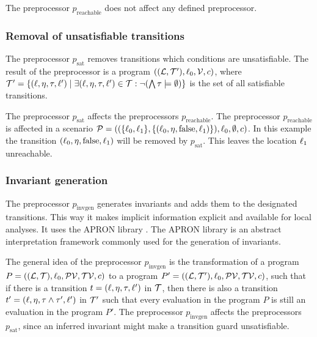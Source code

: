 The preprocessor $p_{\text{reachable}}$ does not affect any defined preprocessor.

\subsubsection{Removal of unsatisfiable transitions}

The preprocessor $p_{\text{sat}}$ removes transitions which conditions are unsatisfiable.
The result of the preprocessor is a program $((\mathcal{L}, \mathcal{T}'), \ell_0, \mathcal{V}, c)$, where $\mathcal{T}' = \lbrace (\ell,\eta,\tau,\ell') \mid \exists (\ell,\eta,\tau,\ell') \in \mathcal{T}: \neg (\bigwedge \tau \models \emptyset) \rbrace$ is the set of all satisfiable transitions.

The preprocessor $p_{\text{sat}}$ affects the preprocessors $p_{\text{reachable}}$.
The preprocessor $p_{\text{reachable}}$ is affected in a scenario $\mathcal{P} = ((\lbrace \ell_0, \ell_1 \rbrace, \lbrace (\ell_0,\eta,\text{false},\ell_1) \rbrace), \ell_0, \emptyset, c)$.
In this example the transition $(\ell_0,\eta,\text{false},\ell_1)$ will be removed by $p_{\text{sat}}$.
This leaves the location $\ell_1$ unreachable.

\subsubsection{Invariant generation}

The preprocessor $p_{\text{invgen}}$ generates invariants and adds them to the designated transitions.
This way it makes implicit information explicit and available for local analyses.
It uses the APRON library \cite{apron}.
The APRON library is an abstract interpretation framework commonly used for the generation of invariants.

The general idea of the preprocessor $p_{\text{invgen}}$ is the transformation of a program $P = ((\mathcal{L}, \mathcal{T}), \ell_0, \mathcal{PV}, \mathcal{TV}, c)$ to a program $P' = ((\mathcal{L}, \mathcal{T}'), \ell_0, \mathcal{PV}, \mathcal{TV}, c)$, such that if there is a transition $t = (\ell, \eta, \tau, \ell')$ in $\mathcal{T}$, then there is also a transition $t' = (\ell, \eta, \tau \wedge \tau', \ell')$ in $\mathcal{T}'$ such that every evaluation in the program $P$ is still an evaluation in the program $P'$.
The preprocessor $p_{\text{invgen}}$ affects the preprocessors $p_{\text{sat}}$, since an inferred invariant might make a transition guard unsatisfiable.

